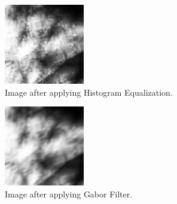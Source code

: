 \begin{enumerate}
    \begin{figure}[!ht]
        \centering
        \begin{subfigure}[t]{0.48\columnwidth}
            \includegraphics[width=\textwidth]{./images/preprocessing/rectified_image_equalized.png}
            \caption{Image after applying Histogram Equalization.}
            \label{fig:rectified_image_equalized}
        \end{subfigure}
        \hfill
        \begin{subfigure}[t]{0.48\columnwidth}
            \includegraphics[width=\textwidth]{./images/preprocessing/gabor_filtered_image.png}
            \caption{Image after applying Gabor Filter.}
            \label{fig:gabor_filtered_image}
        \end{subfigure}
        \caption{}
    \end{figure}


\end{enumerate}
